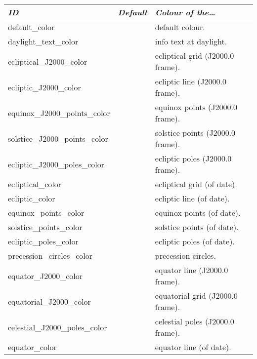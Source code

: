 \begin{longtabu} to \textwidth {l|l|X}
\toprule
\emph{ID}	& \emph{Default} & \emph{Colour of the\ldots}\\
\midrule
default\_color           				&  & default colour.\\\midrule
daylight\_text\_color            		&  & info text at daylight. \\\midrule
ecliptical\_J2000\_color 				&  &  ecliptical grid (J2000.0 frame). \\\midrule
ecliptic\_J2000\_color   				&  &  ecliptic line (J2000.0 frame). \\\midrule
equinox\_J2000\_points\_color			&  &  equinox points (J2000.0 frame). \\\midrule
solstice\_J2000\_points\_color			&  &  solstice points (J2000.0 frame). \\\midrule
ecliptic\_J2000\_poles\_color			&  &  ecliptic poles (J2000.0 frame). \\\midrule
ecliptical\_color        				&  &  ecliptical grid (of date). \\\midrule
ecliptic\_color          				&  &  ecliptic line (of date). \\\midrule
equinox\_points\_color					&  &  equinox points (of date). \\\midrule
solstice\_points\_color					&  &  solstice points (of date). \\\midrule
ecliptic\_poles\_color					&  &  ecliptic poles (of date). \\\midrule
precession\_circles\_color 				&  &  precession circles. \\\midrule
equator\_J2000\_color      				&  &  equator line (J2000.0 frame). \\\midrule
equatorial\_J2000\_color 				&  &  equatorial grid (J2000.0 frame). \\\midrule
celestial\_J2000\_poles\_color			&  &  celestial poles (J2000.0 frame). \\\midrule
equator\_color           				&  &  equator line (of date). \\\midrule

\end{longtabu}
